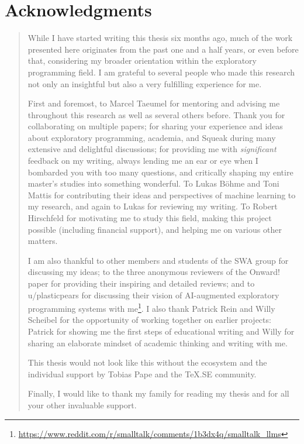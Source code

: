 
\begingroup
\let\raggedsection\centering

\chapter*{Acknowledgments}
\label{cha:acknowledgments}
\endgroup
\begin{quotation}
	\noindent
	While I have started writing this thesis six months ago, much of the work presented here originates from the past one and a half years, or even before that, considering my broader orientation within the exploratory programming field.
	I am grateful to several people who made this research not only an insightful but also a very fulfilling experience for me.

	First and foremost, to Marcel Taeumel for mentoring and advising me throughout this research as well as several others before. Thank you for collaborating on multiple papers; for sharing your experience and ideas about exploratory programming, academia, and Squeak during many extensive and delightful discussions; for providing me with \emph{significant} feedback on my writing, always lending me an ear or eye when I bombarded you with too many questions, and critically shaping my entire master's studies into something wonderful.
	To Lukas Böhme and Toni Mattis for contributing their ideas and perspectives of machine learning to my research, and again to Lukas for reviewing my writing.
	To Robert Hirschfeld for motivating me to study this field, making this project possible (including financial support), and helping me on various other matters.

	I am also thankful to other members and students of the SWA group for discussing my ideas; to the three anonymous reviewers of the Onward! paper for providing their inspiring and detailed reviews; and to u/plasticpears for discussing their vision of AI-augmented exploratory programming systems with me\footnote{\url{https://www.reddit.com/r/smalltalk/comments/1b3dx4q/smalltalk_llms}}.
	I also thank Patrick Rein and Willy Scheibel for the opportunity of working together on earlier projects: Patrick for showing me the first steps of educational writing and Willy for sharing an elaborate mindset of academic thinking and writing with me.

	This thesis would not look like this without the ecosystem and the individual support by Tobias Pape and the \TeX.SE community.

	Finally, I would like to thank my family for reading my thesis and for all your other invaluable support.
\end{quotation}
